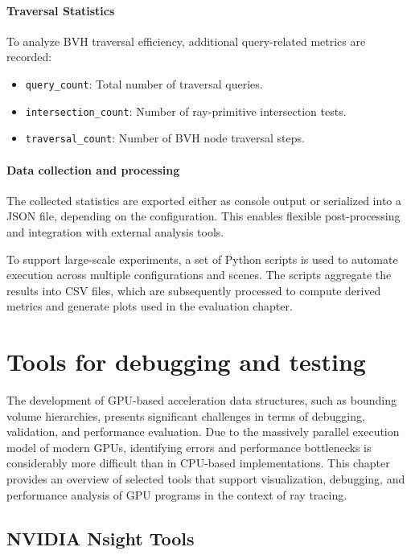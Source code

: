 \paragraph{Traversal Statistics} To analyze BVH traversal efficiency, additional query-related metrics are recorded:

\begin{itemize}
    \item \texttt{query\_count}: Total number of traversal queries.
    \item \texttt{intersection\_count}: Number of ray-primitive intersection tests.
    \item \texttt{traversal\_count}: Number of BVH node traversal steps.
\end{itemize}

\paragraph{Data collection and processing}

The collected statistics are exported either as console output or serialized into a JSON file, depending on the configuration. This enables flexible post-processing and integration with external analysis tools.

To support large-scale experiments, a set of Python scripts is used to automate execution across multiple configurations and scenes. The scripts aggregate the results into CSV files, which are subsequently processed to compute derived metrics and generate plots used in the evaluation chapter.

\section{Tools for debugging and testing}

The development of GPU-based acceleration data structures, such as bounding volume hierarchies, presents significant challenges in terms of debugging, validation, and performance evaluation. Due to the massively parallel execution model of modern GPUs, identifying errors and performance bottlenecks is considerably more difficult than in CPU-based implementations. This chapter provides an overview of selected tools that support visualization, debugging, and performance analysis of GPU programs in the context of ray tracing.

\subsection{NVIDIA Nsight Tools}

